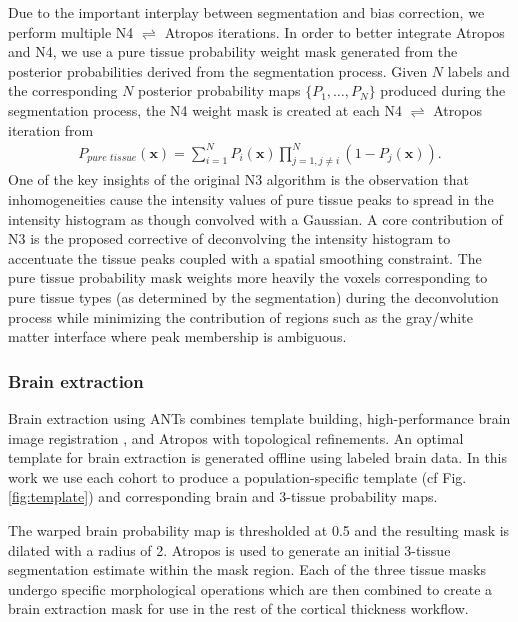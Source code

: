 Due to the important interplay between segmentation and bias correction,
we perform multiple N4 $\rightleftharpoons$ Atropos iterations.
In order to better integrate Atropos and N4, we use  
a pure tissue probability weight mask generated from the 
posterior probabilities derived from the segmentation 
process.  Given $N$ labels and the corresponding $N$
posterior probability maps $\{ P_1, \ldots, P_N\}$ produced
during the segmentation process, the N4 weight mask is 
created at each N4 $\rightleftharpoons$ Atropos iteration from
\begin{align}
  P_{pure\,\,tissue}(\mathbf{x}) = \sum_{i=1}^N P_i(\mathbf{x}) \prod_{j=1, j \neq i}^N \left( 1 - P_j(\mathbf{x}) \right).
\end{align}
One of the key insights of the original N3 algorithm is the
observation that inhomogeneities cause the intensity values of
pure tissue peaks to spread in the intensity histogram as though
convolved with a Gaussian.  A core contribution of N3 is the
proposed corrective of deconvolving the intensity histogram to 
accentuate the tissue peaks coupled with a spatial smoothing 
constraint. The pure tissue probability mask
weights more heavily the voxels corresponding to pure tissue 
types (as determined by the segmentation) during the deconvolution process 
while minimizing the contribution of regions such as the gray/white matter 
interface where peak membership is ambiguous. 

\subsubsection{Brain extraction}

Brain extraction using ANTs combines template building, high-performance
brain image registration \citep{avants2011}, and Atropos with topological refinements.  
An optimal template for brain extraction is 
generated offline using labeled brain data.  
In this work we use each cohort to produce a population-specific template 
(cf Fig. \ref{fig:template}) and corresponding brain and 3-tissue probability
maps. 

  The warped brain probability map is thresholded at 0.5 and the resulting mask is dilated
with a radius of 2.  Atropos is used to generate an initial 3-tissue segmentation estimate within the mask
region.  Each of the three tissue masks undergo specific morphological operations which are then
combined to create a brain extraction mask for use in the rest of the
cortical thickness workflow.  

